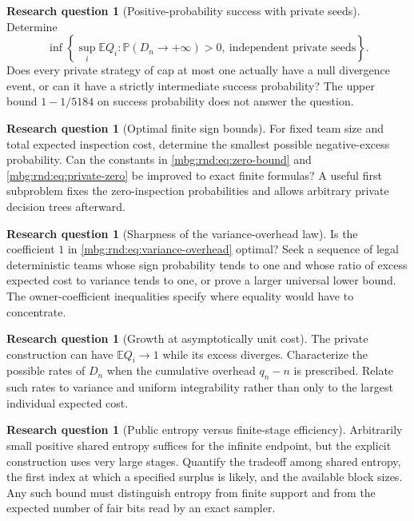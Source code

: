 \documentclass[11pt,letterpaper]{article}
\theoremstyle{definition}
\newcommand{\E}{\mathbb E}
\newcommand{\Prb}{\mathbb P}
\newtheorem{question}[theorem]{Research question}
\begin{document}
\begin{question}[Positive-probability success with private seeds]
Determine
\[
 \inf\left\{\sup_i\E Q_i:
     \Prb(D_n\to+\infty)>0,\ \text{independent private seeds}\right\}.
\]
Does every private strategy of cap at most one actually have a null
divergence event, or can it have a strictly intermediate success
probability? The upper bound $1-1/5184$ on success probability does not
answer the question.
\end{question}

\begin{question}[Optimal finite sign bounds]
For fixed team size and total expected inspection cost, determine the
smallest possible negative-excess probability. Can the constants in
\eqref{mbg:rnd:eq:zero-bound} and \eqref{mbg:rnd:eq:private-zero} be improved to exact
finite formulas? A useful first subproblem fixes the zero-inspection
probabilities and allows arbitrary private decision trees afterward.
\end{question}

\begin{question}[Sharpness of the variance-overhead law]
Is the coefficient $1$ in \eqref{mbg:rnd:eq:variance-overhead} optimal? Seek a
sequence of legal deterministic teams whose sign probability tends to
one and whose ratio of excess expected cost to variance tends to one,
or prove a larger universal lower bound. The owner-coefficient
inequalities specify where equality would have to concentrate.
\end{question}

\begin{question}[Growth at asymptotically unit cost]
The private construction can have $\E Q_i\to1$ while its excess
diverges. Characterize the possible rates of $D_n$ when the cumulative
overhead $q_n-n$ is prescribed. Relate such rates to variance and
uniform integrability rather than only to the largest individual
expected cost.
\end{question}

\begin{question}[Public entropy versus finite-stage efficiency]
Arbitrarily small positive shared entropy suffices for the infinite
endpoint, but the explicit construction uses very large stages.
Quantify the tradeoff among shared entropy, the first index at which a
specified surplus is likely, and the available block sizes. Any such
bound must distinguish entropy from finite support and from the
expected number of fair bits read by an exact sampler.
\end{question}
\end{document}
